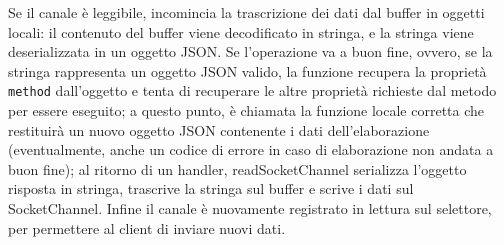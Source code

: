 \documentclass{article}
\begin{document}
Se il canale è leggibile, incomincia la trascrizione dei dati dal buffer in oggetti locali: il contenuto del buffer viene decodificato in stringa, e la stringa viene deserializzata in un oggetto JSON. Se l'operazione va a buon fine, ovvero, se la stringa rappresenta un oggetto JSON valido, la funzione recupera la proprietà \texttt{method} dall'oggetto e tenta di recuperare le altre proprietà richieste dal metodo per essere eseguito; a questo punto, è chiamata la funzione locale corretta che restituirà un nuovo oggetto JSON contenente i dati dell'elaborazione (eventualmente, anche un codice di errore in caso di elaborazione non andata a buon fine); al ritorno di un handler, readSocketChannel serializza l'oggetto risposta in stringa, trascrive la stringa sul buffer e scrive i dati sul SocketChannel. Infine il canale è nuovamente registrato in lettura sul selettore, per permettere al client di inviare nuovi dati.
\end{document}
